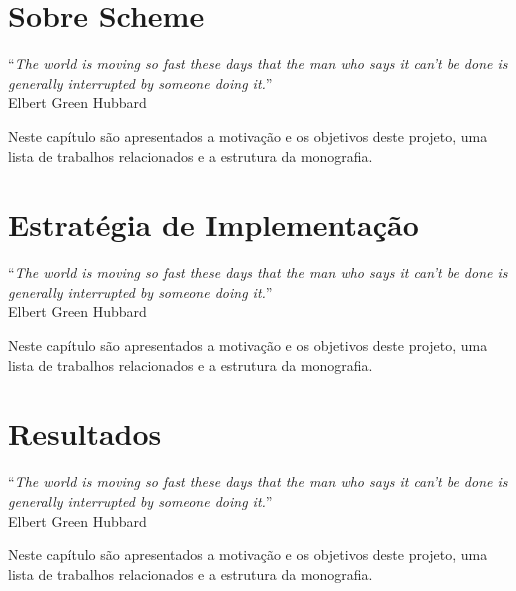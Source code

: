 \documentclass[brazil,pagestart=firstchapter]{abnt}
\begin{document}





\chapter{Sobre Scheme}
\label{cap:scheme}

\vfill{}
\begin{flushright}{}
``\emph{The world is moving so fast these days that the man who says it
can't be done is generally interrupted by someone doing it.}''\\
{\small Elbert Green Hubbard}
\end{flushright}{\small \par}
\vfill{}

Neste capítulo são apresentados a motivação e os objetivos deste projeto, uma
lista de trabalhos relacionados e a estrutura da monografia.
\newpage






\chapter{Estratégia de Implementação}
\label{cap:estrategia}

\vfill{}
\begin{flushright}{}
``\emph{The world is moving so fast these days that the man who says it
can't be done is generally interrupted by someone doing it.}''\\
{\small Elbert Green Hubbard}
\end{flushright}{\small \par}
\vfill{}

Neste capítulo são apresentados a motivação e os objetivos deste projeto, uma
lista de trabalhos relacionados e a estrutura da monografia.
\newpage









\chapter{Resultados}
\label{cap:resultados}

\vfill{}
\begin{flushright}{}
``\emph{The world is moving so fast these days that the man who says it
can't be done is generally interrupted by someone doing it.}''\\
{\small Elbert Green Hubbard}
\end{flushright}{\small \par}
\vfill{}

Neste capítulo são apresentados a motivação e os objetivos deste projeto, uma
lista de trabalhos relacionados e a estrutura da monografia.
\newpage


{}

\end{document}
